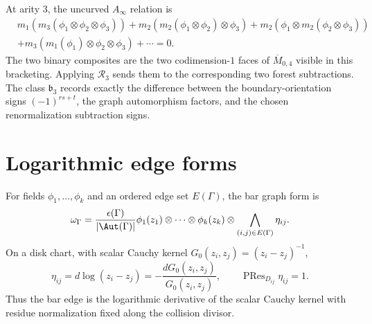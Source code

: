 \begin{example}
At arity \(3\), the uncurved \(A_\infty\) relation is
\begin{align*}
&m_1(m_3(\phi_1 \otimes \phi_2 \otimes \phi_3))
+ m_2(m_2(\phi_1 \otimes \phi_2) \otimes \phi_3)
+ m_2(\phi_1 \otimes m_2(\phi_2 \otimes \phi_3)) \\
&+ m_3(m_1(\phi_1) \otimes \phi_2 \otimes \phi_3) + \cdots = 0.
\end{align*}
The two binary composites are the two codimension-\(1\) faces of
\(\overline{M}_{0,4}\) visible in this bracketing.  Applying
\(\mathcal R_3\) sends them to the corresponding two forest
subtractions.  The class \(\mathfrak b_3\) records exactly the
difference between the boundary-orientation signs
\((-1)^{rs+t}\), the graph automorphism factors, and the chosen
renormalization subtraction signs.
\end{example}

\section{Logarithmic edge forms}

\begin{definition}
\label{def:bar-graph-form}
For fields \(\phi_1,\ldots,\phi_k\) and an ordered edge set
\(E(\Gamma)\), the bar graph form is
\[
\omega_\Gamma
=\frac{\epsilon(\Gamma)}{|\Aut(\Gamma)|}
\phi_1(z_1)\otimes\cdots\otimes\phi_k(z_k)
\otimes\bigwedge_{(i,j)\in E(\Gamma)}\eta_{ij}.
\]
On a disk chart, with scalar Cauchy kernel
\(G_0(z_i,z_j)=(z_i-z_j)^{-1}\),
\[
\eta_{ij}=d\log(z_i-z_j)=-\frac{dG_0(z_i,z_j)}{G_0(z_i,z_j)},
\qquad
\operatorname{PRes}_{D_{ij}}\eta_{ij}=1.
\]
Thus the bar edge is the logarithmic derivative of the scalar Cauchy
kernel with residue normalization fixed along the collision divisor.
\end{definition}

\label{sec:summary-feynman-unity}
